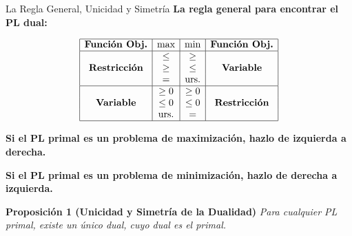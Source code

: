 \documentclass{beamer}
\begin{document}
\begin{frame}{La Regla General, Unicidad y Simetría}
    \textbf{La regla general para encontrar el PL dual:}

    \vspace{0.3cm}
    \[
    \begin{array}{|c|c|c|c|c|}
    \hline
    \textbf{Función Obj.} & \text{max} & \text{min} & \textbf{Función Obj.} \\
    \hline
    & \leq & \geq & \\
    \textbf{Restricción}& \geq & \leq & \textbf{Variable}\\
    & = & \text{urs.} & \\
    \hline
    & \geq 0 & \geq 0 & \\
    \textbf{Variable}& \leq 0 & \leq 0 & \textbf{Restricción}\\
    & \text{urs.} & = & \\
    \hline
    \end{array}
    \]

    \vspace{0.5cm}
    \textbf{Si el PL primal es un problema de maximización, hazlo de izquierda a derecha.}

    \textbf{Si el PL primal es un problema de minimización, hazlo de derecha a izquierda.}

    \vspace{0.5cm}
    \begin{block}{\textbf{Proposición 1 (Unicidad y Simetría de la Dualidad)}}
        \textit{Para cualquier PL primal, existe un único dual, cuyo dual es el primal.}
    \end{block}
\end{frame}
\end{document}
